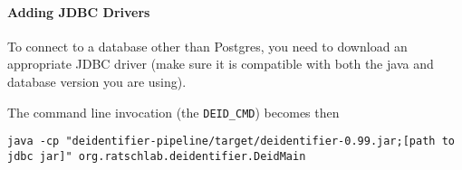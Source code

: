 \paragraph{Adding JDBC Drivers}\label{adding-jdbc-drivers}

To connect to a database other than Postgres, you need to download an
appropriate JDBC driver (make sure it is compatible with both the java
and database version you are using).

The command line invocation (the \texttt{DEID\_CMD}) becomes then

\begin{verbatim}
java -cp "deidentifier-pipeline/target/deidentifier-0.99.jar;[path to jdbc jar]" org.ratschlab.deidentifier.DeidMain
\end{verbatim}

